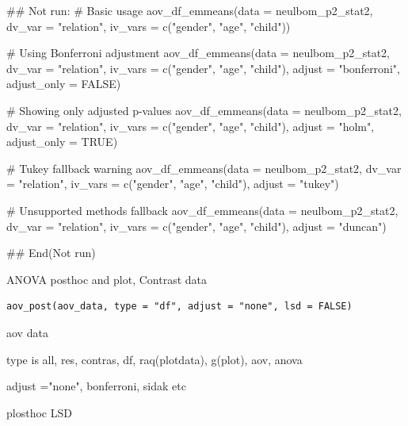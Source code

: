 \documentclass[a4paper]{book}
\begin{document}
\begin{Examples}
\begin{ExampleCode}
\#\# Not run: 
# Basic usage
aov_df_emmeans(data = neulbom_p2_stat2,
               dv_var = "relation",
               iv_vars = c("gender", "age", "child"))

# Using Bonferroni adjustment
aov_df_emmeans(data = neulbom_p2_stat2,
               dv_var = "relation",
               iv_vars = c("gender", "age", "child"),
               adjust = "bonferroni", adjust_only = FALSE)

# Showing only adjusted p-values
aov_df_emmeans(data = neulbom_p2_stat2,
               dv_var = "relation",
               iv_vars = c("gender", "age", "child"),
               adjust = "holm", adjust_only = TRUE)

# Tukey fallback warning
aov_df_emmeans(data = neulbom_p2_stat2,
               dv_var = "relation",
               iv_vars = c("gender", "age", "child"),
               adjust = "tukey")

# Unsupported methods fallback
aov_df_emmeans(data = neulbom_p2_stat2,
               dv_var = "relation",
               iv_vars = c("gender", "age", "child"),
               adjust = "duncan")

## End(Not run)
\end{ExampleCode}
\end{Examples}
%
\begin{Description}
ANOVA posthoc and plot, Contrast data
\end{Description}
%
\begin{Usage}
\begin{verbatim}
aov_post(aov_data, type = "df", adjust = "none", lsd = FALSE)
\end{verbatim}
\end{Usage}
%
\begin{Arguments}
\begin{ldescription}
\item[\code{aov\_data}] aov data

\item[\code{type}] type is all, res, contras, df, raq(plotdata), g(plot), aov, anova

\item[\code{adjust}] adjust ="none", bonferroni, sidak etc

\item[\code{lsd}] plosthoc LSD
\end{ldescription}
\end{Arguments}
\end{document}
